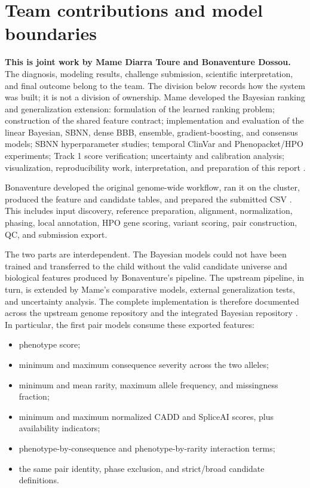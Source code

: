 \documentclass[11pt]{article}
\begin{document}
\section{Team contributions and model boundaries}

\textbf{This is joint work by Mame Diarra Toure and Bonaventure Dossou.} The diagnosis, modeling results, challenge submission, scientific interpretation, and final outcome belong to the team. The division below records how the system was built; it is not a division of ownership.
Mame developed the Bayesian ranking and generalization extension: formulation of the learned ranking problem; construction of the shared feature contract; implementation and evaluation of the linear Bayesian, SBNN, dense BBB, ensemble, gradient-boosting, and consensus models; SBNN hyperparameter studies; temporal ClinVar and Phenopacket/HPO experiments; Track 1 score verification; uncertainty and calibration analysis; visualization, reproducibility work, interpretation, and preparation of this report \citep{tourerepo2026}.

Bonaventure developed the original genome-wide workflow, ran it on the cluster, produced the feature and candidate tables, and prepared the submitted CSV \citep{dossourepo2026}. This includes input discovery, reference preparation, alignment, normalization, phasing, local annotation, HPO gene scoring, variant scoring, pair construction, QC, and submission export.

The two parts are interdependent. The Bayesian models could not have been trained and transferred to the child without the valid candidate universe and biological features produced by Bonaventure's pipeline. The upstream pipeline, in turn, is extended by Mame's comparative models, external generalization tests, and uncertainty analysis. The complete implementation is therefore documented across the upstream genome repository and the integrated Bayesian repository \citep{dossourepo2026,tourerepo2026}. In particular, the first pair models consume these exported features:
\begin{itemize}
\item phenotype score;
\item minimum and maximum consequence severity across the two alleles;
\item minimum and mean rarity, maximum allele frequency, and missingness fraction;
\item minimum and maximum normalized CADD and SpliceAI scores, plus availability indicators;
\item phenotype-by-consequence and phenotype-by-rarity interaction terms;
\item the same pair identity, phase exclusion, and strict/broad candidate definitions.
\end{itemize}
\end{document}
